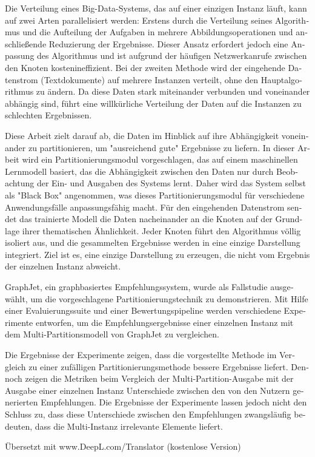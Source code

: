 \null\vfil
\begin{otherlanguage}{ngerman}
\begin{center}\textsf{\textbf{\abstractname}}\end{center}

\noindent
Die Verteilung eines Big-Data-Systems, das auf einer einzigen Instanz läuft, kann auf zwei Arten parallelisiert werden: Erstens durch die Verteilung seines Algorithmus und die Aufteilung der Aufgaben in mehrere Abbildungsoperationen und anschließende Reduzierung der Ergebnisse. Dieser Ansatz erfordert jedoch eine Anpassung des Algorithmus und ist aufgrund der häufigen Netzwerkanrufe zwischen den Knoten kostenineffizient. Bei der zweiten Methode wird der eingehende Datenstrom (Textdokumente) auf mehrere Instanzen verteilt, ohne den Hauptalgorithmus zu ändern. Da diese Daten stark miteinander verbunden und voneinander abhängig sind, führt eine willkürliche Verteilung der Daten auf die Instanzen zu schlechten Ergebnissen.

Diese Arbeit zielt darauf ab, die Daten im Hinblick auf ihre Abhängigkeit voneinander zu partitionieren, um "ausreichend gute" Ergebnisse zu liefern. In dieser Arbeit wird ein Partitionierungsmodul vorgeschlagen, das auf einem maschinellen Lernmodell basiert, das die Abhängigkeit zwischen den Daten nur durch Beobachtung der Ein- und Ausgaben des Systems lernt. Daher wird das System selbst als "Black Box" angenommen, was dieses Partitionierungsmodul für verschiedene Anwendungsfälle anpassungsfähig macht. Für den eingehenden Datenstrom sendet das trainierte Modell die Daten nacheinander an die Knoten auf der Grundlage ihrer thematischen Ähnlichkeit. Jeder Knoten führt den Algorithmus völlig isoliert aus, und die gesammelten Ergebnisse werden in eine einzige Darstellung integriert. Ziel ist es, eine einzige Darstellung zu erzeugen, die nicht vom Ergebnis der einzelnen Instanz abweicht.

GraphJet, ein graphbasiertes Empfehlungssystem, wurde als Fallstudie ausgewählt, um die vorgeschlagene Partitionierungstechnik zu demonstrieren. Mit Hilfe einer Evaluierungssuite und einer Bewertungspipeline werden verschiedene Experimente entworfen, um die Empfehlungsergebnisse einer einzelnen Instanz mit dem Multi-Partitionsmodell von GraphJet zu vergleichen.


Die Ergebnisse der Experimente zeigen, dass die vorgestellte Methode im Vergleich zu einer zufälligen Partitionierungsmethode bessere Ergebnisse liefert. Dennoch zeigen die Metriken beim Vergleich der Multi-Partition-Ausgabe mit der Ausgabe einer einzelnen Instanz Unterschiede zwischen den von den Nutzern generierten Empfehlungen. Die Ergebnisse der Experimente lassen jedoch nicht den Schluss zu, dass diese Unterschiede zwischen den Empfehlungen zwangsläufig bedeuten, dass die Multi-Instanz irrelevante Elemente liefert.

Übersetzt mit www.DeepL.com/Translator (kostenlose Version)
\end{otherlanguage}
\vfil\null



